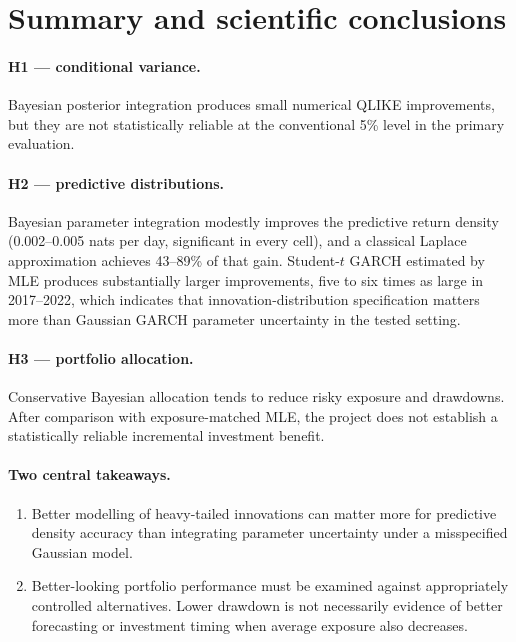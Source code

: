 \documentclass[11pt]{article}
\begin{document}
\section{Summary and scientific conclusions}\label{sec:summary}
\paragraph{H1 --- conditional variance.} Bayesian posterior integration produces small numerical QLIKE improvements,
but they are not statistically reliable at the conventional 5\% level in the primary evaluation.

\paragraph{H2 --- predictive distributions.} Bayesian parameter integration modestly improves the predictive return
density (0.002--0.005 nats per day, significant in every cell), and a classical Laplace approximation achieves 43--89\%
of that gain. Student-$t$ GARCH estimated by MLE produces substantially larger improvements, five to six times as large
in 2017--2022, which indicates that innovation-distribution specification matters more than Gaussian GARCH parameter
uncertainty in the tested setting.

\paragraph{H3 --- portfolio allocation.} Conservative Bayesian allocation tends to reduce risky exposure and
drawdowns. After comparison with exposure-matched MLE, the project does not establish a statistically reliable
incremental investment benefit.

\paragraph{Two central takeaways.}
\begin{enumerate}
\item Better modelling of heavy-tailed innovations can matter more for predictive density accuracy than integrating
parameter uncertainty under a misspecified Gaussian model.
\item Better-looking portfolio performance must be examined against appropriately controlled alternatives. Lower
drawdown is not necessarily evidence of better forecasting or investment timing when average exposure also decreases.
\end{enumerate}
\end{document}
